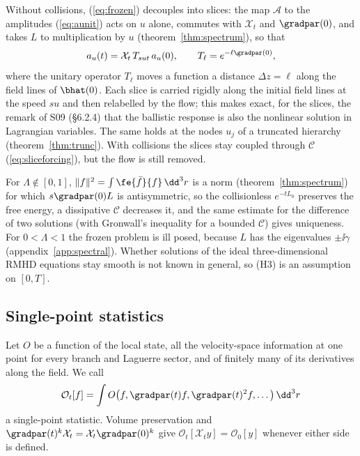 Without collisions, (\ref{eq:frozen}) decouples into slices: the map $\mathcal A$ to the amplitudes (\ref{eq:aunit}) acts on $u$ alone, commutes with $\mathcal X_t$ and $\gradpar(0)$, and takes $L$ to multiplication by $u$ (theorem~\ref{thm:spectrum}), so that
\begin{equation}\label{lag:sliceform}
  a_u(t)=\mathcal X_t\,T_{sut}\,a_u(0),\qquad T_\ell=e^{-\ell\gradpar(0)} ,
\end{equation}
where the unitary operator $T_\ell$ moves a function a distance $\Delta z=\ell$ along the field lines of $\bhat(0)$. Each slice is carried rigidly along the initial field lines at the speed $su$ and then relabelled by the flow; this makes exact, for the slices, the remark of S09 (\S6.2.4) that the ballistic response is also the nonlinear solution in Lagrangian variables. The same holds at the nodes $u_j$ of a truncated hierarchy (theorem~\ref{thm:trunc}). With collisions the slices stay coupled through $\mathcal C$ (\ref{eq:sliceforcing}), but the flow is still removed.

For $\Lambda\notin[0,1]$, $\|f\|^2=\int\fe{\bar f}{f}\,\dd^3r$ is a norm (theorem~\ref{thm:spectrum}) for which $s\gradpar(0)L$ is antisymmetric, so the collisionless $e^{-tL_0}$ preserves the free energy, a dissipative $\mathcal C$ decreases it, and the same estimate for the difference of two solutions (with Gronwall's inequality for a bounded $\mathcal C$) gives uniqueness. For $0<\Lambda<1$ the frozen problem is ill posed, because $L$ has the eigenvalues $\pm\ii\gamma$ (appendix~\ref{app:spectral}). Whether solutions of the ideal three-dimensional RMHD equations stay smooth is not known in general, so (H3) is an assumption on $[0,T]$.

\subsection{Single-point statistics}

Let $O$ be a function of the local state, all the velocity-space information at one point for every branch and Laguerre sector, and of finitely many of its derivatives along the field. We call
\begin{equation}\label{lag:Odef}
  \mathcal O_t[f]=\int O\big(f,\gradpar(t)f,\gradpar(t)^2f,\dots\big)\,\dd^3r
\end{equation}
a single-point statistic. Volume preservation and $\gradpar(t)^k\mathcal X_t=\mathcal X_t\gradpar(0)^k$ give $\mathcal O_t[\mathcal X_ty]=\mathcal O_0[y]$ whenever either side is defined.

